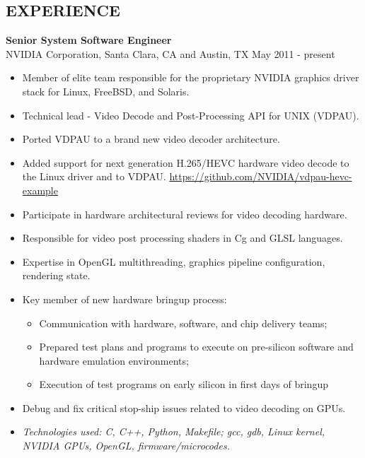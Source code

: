 \documentclass[line,margin]{res}
\begin{document}
\begin{resume}
\section{EXPERIENCE}

\textbf{Senior System Software Engineer} \\
NVIDIA Corporation, Santa Clara, CA and Austin, TX \hfill May 2011 - present
\begin{itemize}  \itemsep -2pt %
\item Member of elite team responsible for the proprietary NVIDIA graphics
      driver stack for Linux, FreeBSD, and Solaris.
\item Technical lead - Video Decode and Post-Processing API for UNIX (VDPAU).
\item Ported VDPAU to a brand new video decoder architecture.
\item Added support for next generation H.265/HEVC hardware video decode to
      the Linux driver and to VDPAU.
      \url{https://github.com/NVIDIA/vdpau-hevc-example}
\item Participate in hardware architectural reviews for video decoding hardware.
\item Responsible for video post processing shaders in Cg and GLSL languages.
\item Expertise in OpenGL multithreading, graphics pipeline configuration,
      rendering state.
\item Key member of new hardware bringup process:
    \begin{itemize}  \itemsep -2pt %
    \item Communication with hardware, software, and chip delivery teams;
    \item Prepared test plans and programs to execute on pre-silicon software
          and hardware emulation environments;
    \item Execution of test programs on early silicon in first days of bringup
    \end{itemize}
\item Debug and fix critical stop-ship issues related to video decoding on GPUs.
\item \textit{Technologies used: C, C++, Python, Makefile; gcc, gdb, Linux
              kernel, NVIDIA GPUs, OpenGL, firmware/microcodes.}
\end{itemize}


\end{resume}
\end{document}
